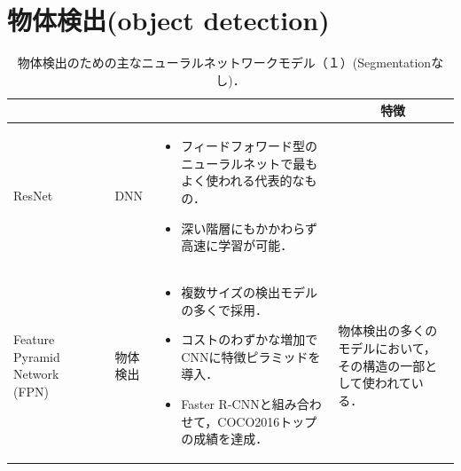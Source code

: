 \documentclass[twocolumn]{jsarticle} %
\begin{document}
\section{物体検出(object detection)}
\begin{table}
    \caption{物体検出のための主なニューラルネットワークモデル（１）(Segmentationなし)．}
    \label{tbl-cheat1}
    \begin{center}
        \setlength{\tabcolsep}{3pt}
        \footnotesize
        \begin{tabularx}{\linewidth}{Xp{1.5cm}Xp{7cm}X} \toprule
            \centering{モデル名称} & \centering{文献} & \centering{用途} & \centering{概要} & \multicolumn{1}{c}{特徴} \\ \midrule

            ResNet & \cite{HZRS16} & DNN & 
            \begin{itemize}
                \vspace{-0.7\baselineskip}
                \setlength{\leftskip}{-3mm}
                \item フィードフォワード型のニューラルネットで最もよく使われる代表的なもの．
                \item  深い階層にもかかわらず高速に学習が可能．
            \end{itemize} &   \\
            
            Feature Pyramid Network (FPN) & \cite{LDGHHB17} & 物体検出 & 
            \begin{itemize}
                \vspace{-0.7\baselineskip}
                \setlength{\leftskip}{-3mm}
                \item 複数サイズの検出モデルの多くで採用．
                \item コストのわずかな増加でCNNに特徴ピラミッドを導入．
                \item Faster R-CNNと組み合わせて，COCO2016トップの成績を達成． 
            \end{itemize}
            & 物体検出の多くのモデルにおいて，その構造の一部として使われている．\\


\end{tabularx}
\end{center}
\end{table}
\end{document}
